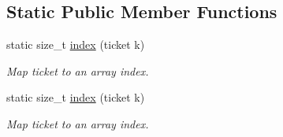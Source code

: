 \subsection*{Static Public Member Functions}
\begin{DoxyCompactItemize}
\item 
\hypertarget{classtbb_1_1internal_1_1concurrent__queue__rep_a04f274a4f9002d3a43a7d64d03e174c8}{}static size\+\_\+t \hyperlink{classtbb_1_1internal_1_1concurrent__queue__rep_a04f274a4f9002d3a43a7d64d03e174c8}{index} (ticket k)\label{classtbb_1_1internal_1_1concurrent__queue__rep_a04f274a4f9002d3a43a7d64d03e174c8}

\begin{DoxyCompactList}\small\item\em Map ticket to an array index. \end{DoxyCompactList}\item 
\hypertarget{classtbb_1_1internal_1_1concurrent__queue__rep_a04f274a4f9002d3a43a7d64d03e174c8}{}static size\+\_\+t \hyperlink{classtbb_1_1internal_1_1concurrent__queue__rep_a04f274a4f9002d3a43a7d64d03e174c8}{index} (ticket k)\label{classtbb_1_1internal_1_1concurrent__queue__rep_a04f274a4f9002d3a43a7d64d03e174c8}

\begin{DoxyCompactList}\small\item\em Map ticket to an array index. \end{DoxyCompactList}\end{DoxyCompactItemize}
